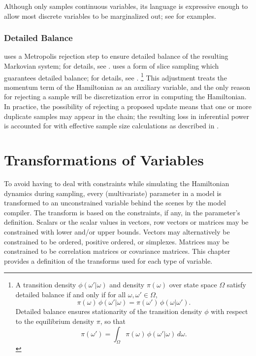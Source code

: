 Although \Stan only samples continuous variables, its language is
expressive enough to allow most discrete variables to be marginalized
out; see  for examples.

\subsection{Detailed Balance}

\HMC uses a Metropolis rejection step to ensure detailed balance of
the resulting Markovian system; for details, see \citep{Neal:2011}.
\NUTS uses a form of slice sampling which guarantees detailed balance;
for details, see \citep{Hoffman-Gelman:2011,Hoffman-Gelman:2014}.%
%
\footnote{A transition density $\phi(\omega'|\omega)$ and density
  $\pi(\omega)$ over state space $\Omega$ satisfy detailed balance if
  and only if for all $\omega, \omega' \in \Omega$,
\[
\pi(\omega) \, \phi(\omega'|\omega)
=
\pi(\omega') \, \phi(\omega | \omega').
\]
Detailed balance ensures stationarity of the transition density $\phi$
with respect to the equilibrium density $\pi$, so that
\[
\pi(\omega') = \int_{\Omega} \pi(\omega) \, \phi(\omega'|\omega) \, d\omega.
\]
} 
%
This adjustment treats the momentum term of the Hamiltonian as an
auxiliary variable, and the only reason for rejecting a sample will be
discretization error in computing the Hamiltonian.  In practice, the
possibility of rejecting a proposed update means that one or more
duplicate samples may appear in the chain; the resulting loss in
inferential power is accounted for with effective sample size
calculations as described in .


\chapter{Transformations of Variables}\label{variable-transforms.chapter}

\noindent
To avoid having to deal with constraints while simulating the
Hamiltonian dynamics during sampling, every (multivariate) parameter
in a \Stan model is transformed to an unconstrained variable behind
the scenes by the model compiler.  The transform is based on the
constraints, if any, in the parameter's definition.  Scalars or the
scalar values in vectors, row vectors or matrices may be constrained
with lower and/or upper bounds.  Vectors may alternatively be
constrained to be ordered, positive ordered, or simplexes.  Matrices
may be constrained to be correlation matrices or covariance matrices.
This chapter provides a definition of the transforms used for each
type of variable.

